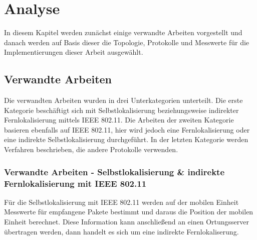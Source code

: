 \chapter{Analyse}
\label{ch:Analyse}
In diesem Kapitel werden zunächst einige verwandte Arbeiten vorgestellt und danach werden auf Basis dieser die Topologie, Protokolle und Messwerte für die Implementierungen dieser Arbeit ausgewählt.

\section{Verwandte Arbeiten} 
Die verwandten Arbeiten wurden in drei Unterkategorien unterteilt. 
Die erste Kategorie beschäftigt sich mit Selbstlokalisierung beziehungsweise indirekter Fernlokalisierung mittels IEEE 802.11.
Die Arbeiten der zweiten Kategorie basieren ebenfalls auf IEEE 802.11, hier wird jedoch eine Fernlokalisierung oder eine indirekte Selbstlokalisierung durchgeführt.
In der letzten Kategorie werden Verfahren beschrieben, die andere Protokolle verwenden.

\subsection{Verwandte Arbeiten - Selbstlokalisierung \& indirekte Fernlokalisierung mit IEEE 802.11}
Für die Selbstlokalisierung mit IEEE 802.11 werden auf der mobilen Einheit Messwerte für empfangene Pakete bestimmt und daraus die Position der mobilen Einheit berechnet.
Diese Information kann anschließend an einen Ortungsserver übertragen werden, dann handelt es sich um eine indirekte Fernlokaliserung.

